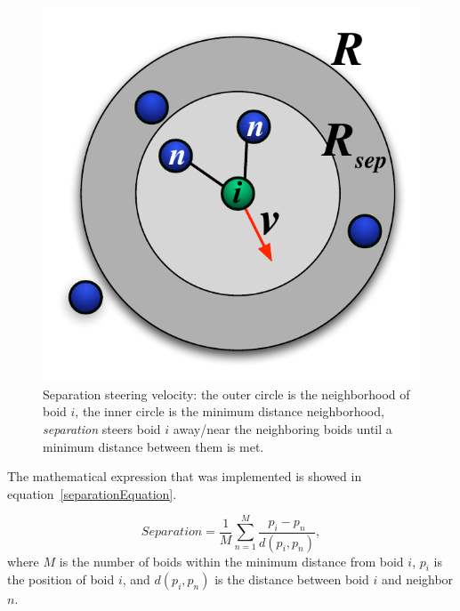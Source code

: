 \begin{figure}[htbp]
\vspace{16pt}
\begin{center}
\includegraphics[scale=0.85]{figures/separation.pdf}
\caption{Separation steering velocity: the outer circle is the neighborhood of boid $i$, the inner circle is the minimum distance neighborhood, \textit{separation} steers boid $i$ away/near the neighboring boids until a minimum distance between them is met.}
\label{separationPDF}
\end{center}
\end{figure}

The mathematical expression that was implemented is showed in equation~\ref{separationEquation}.

\begin{equation}
\label{separationEquation}
Separation =\frac{1}{M} \sum_{n=1}^{M} \frac{p_i - p_n}{d(p_i,p_n)},
\end{equation}
where $M$ is the number of boids within the minimum distance from boid $i$, $p_i$ is the position of boid $i$, and $d(p_i,p_n)$ is the distance between boid $i$ and neighbor $n$.


